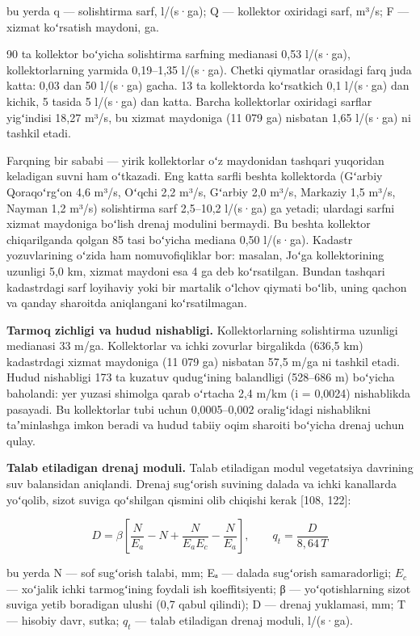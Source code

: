 \documentclass[14pt,a4paper,oneside]{extreport}
\begin{document}
bu yerda q --- solishtirma sarf, l/(s·ga); Q --- kollektor oxiridagi
sarf, m³/s; F --- xizmat koʻrsatish maydoni, ga.

90 ta kollektor boʻyicha solishtirma sarfning medianasi 0,53 l/(s·ga),
kollektorlarning yarmida 0,19--1,35 l/(s·ga). Chetki qiymatlar orasidagi
farq juda katta: 0,03 dan 50 l/(s·ga) gacha. 13 ta kollektorda
koʻrsatkich 0,1 l/(s·ga) dan kichik, 5 tasida 5 l/(s·ga) dan katta.
Barcha kollektorlar oxiridagi sarflar yigʻindisi 18,27 m³/s, bu xizmat
maydoniga (11 079 ga) nisbatan 1,65 l/(s·ga) ni tashkil etadi.

Farqning bir sababi --- yirik kollektorlar oʻz maydonidan tashqari
yuqoridan keladigan suvni ham oʻtkazadi. Eng katta sarfli beshta
kollektorda (Gʻarbiy Qoraqoʻrgʻon 4,6 m³/s, Oʻqchi 2,2 m³/s, Gʻarbiy 2,0
m³/s, Markaziy 1,5 m³/s, Nayman 1,2 m³/s) solishtirma sarf 2,5--10,2
l/(s·ga) ga yetadi; ulardagi sarfni xizmat maydoniga boʻlish drenaj
modulini bermaydi. Bu beshta kollektor chiqarilganda qolgan 85 tasi
boʻyicha mediana 0,50 l/(s·ga). Kadastr yozuvlarining oʻzida ham
nomuvofiqliklar bor: masalan, Joʻga kollektorining uzunligi 5,0 km,
xizmat maydoni esa 4 ga deb koʻrsatilgan. Bundan tashqari kadastrdagi
sarf loyihaviy yoki bir martalik oʻlchov qiymati boʻlib, uning qachon va
qanday sharoitda aniqlangani koʻrsatilmagan.

\textbf{Tarmoq zichligi va hudud nishabligi.} Kollektorlarning
solishtirma uzunligi medianasi 33 m/ga. Kollektorlar va ichki zovurlar
birgalikda (636,5 km) kadastrdagi xizmat maydoniga (11 079 ga) nisbatan
57,5 m/ga ni tashkil etadi. Hudud nishabligi 173 ta kuzatuv qudugʻining
balandligi (528--686 m) boʻyicha baholandi: yer yuzasi shimolga qarab
oʻrtacha 2,4 m/km (i = 0,0024) nishablikda pasayadi. Bu kollektorlar
tubi uchun 0,0005--0,002 oraligʻidagi nishablikni taʼminlashga imkon
beradi va hudud tabiiy oqim sharoiti boʻyicha drenaj uchun qulay.

\textbf{Talab etiladigan drenaj moduli.} Talab etiladigan modul
vegetatsiya davrining suv balansidan aniqlandi. Drenaj sugʻorish
suvining dalada va ichki kanallarda yoʻqolib, sizot suviga qoʻshilgan
qismini olib chiqishi kerak {[}108, 122{]}:

\begin{equation}\tag{4.2}
D = \beta \left[ \frac{N}{E_a} - N + \frac{N}{E_a E_c} - \frac{N}{E_a} \right], \qquad q_t = \frac{D}{8{,}64 \, T}
\end{equation}

bu yerda N --- sof sugʻorish talabi, mm; Eₐ --- dalada sugʻorish
samaradorligi; \(E_{c}\) --- xoʻjalik ichki tarmogʻining foydali ish
koeffitsiyenti; β --- yoʻqotishlarning sizot suviga yetib boradigan
ulushi (0,7 qabul qilindi); D --- drenaj yuklamasi, mm; T --- hisobiy
davr, sutka; \(q_{t}\) --- talab etiladigan drenaj moduli, l/(s·ga).
\end{document}
